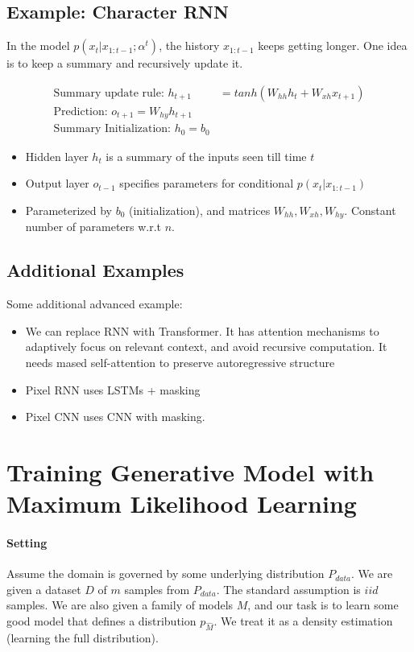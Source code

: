 \subsection{Example: Character RNN} 
In the model $p(x_t|x_{1:t-1}; \alpha^t)$, the history $x_{1:t-1}$ keeps getting longer. One idea is to keep a summary and recursively update it. 

    \begin{align*}
        \textrm{Summary update rule: } h_{t+1} &= tanh(W_{hh}h_t + W_{xh} x_{t+1}) \\
        \textrm{Prediction: } o_{t+1} = W_{hy} h_{t+1} \\
        \textrm{Summary Initialization: } h_0 = b_0
    \end{align*}
    \begin{itemize}
        \item Hidden layer $h_t$ is a summary of the inputs seen till time $t$
        \item Output layer $o_{t-1}$ specifies parameters for conditional $p(x_t|x_{1:t-1})$
        \item Parameterized by $b_0$ (initialization), and matrices $W_{hh}, W_{xh}, W_{hy}$. Constant number of parameters w.r.t $n$. 
    \end{itemize}

\subsection{Additional Examples}
Some additional advanced example: 
    \begin{itemize}
        \item We can replace RNN with Transformer. It has attention mechanisms to adaptively focus on relevant context, and avoid recursive computation. It needs mased self-attention to preserve autoregressive structure 
        \item Pixel RNN uses LSTMs + masking 
        \item Pixel CNN uses CNN with masking. 
    \end{itemize}


\section{Training Generative Model with Maximum Likelihood Learning}
\paragraph{Setting} \mbox{}
Assume the domain is governed by some underlying distribution $P_{data}$. We are given a dataset $D$ of $m$ samples from $P_{data}$. The standard assumption is $iid$ samples. We are also given a family of models $M$, and our task is to learn some good model that defines a distribution $p_{\hat{M}}$. We treat it as a density estimation (learning the full distribution). 

